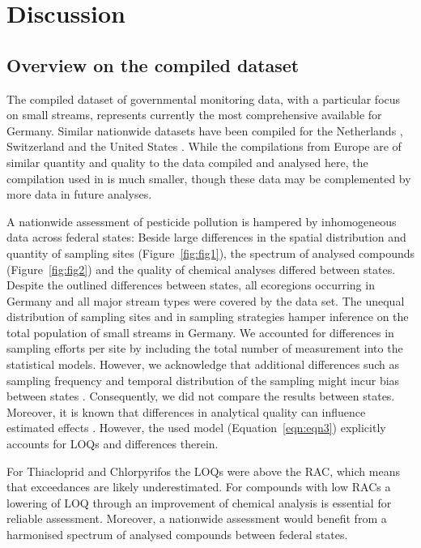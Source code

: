 \documentclass[journal=esthag,manuscript=article]{achemso}
\begin{document}
\section{Discussion}
\subsection{Overview on the compiled dataset}
The compiled dataset of governmental monitoring data, with a particular focus on small streams, represents currently the most comprehensive available for Germany.
Similar nationwide datasets have been compiled for the Netherlands \citep{vijver_spatial_2008}, Switzerland \citep{munz_pestizidmessungen_2011} and the United States \citep{stone2014pesticides}.
While the compilations from Europe are of similar quantity and quality to the  data compiled and analysed here, the compilation used in \citet{stone2014pesticides} is much smaller, though these data may be complemented by more data in future analyses. 

A nationwide assessment of pesticide pollution is hampered by inhomogeneous data across federal states:
Beside large differences in the spatial distribution and quantity of sampling sites (Figure~\ref{fig:fig1}), the spectrum of analysed compounds (Figure~\ref{fig:fig2}) and the quality of chemical analyses differed between states. 
Despite the outlined differences between states, all ecoregions occurring in Germany \citep{illies1978limnofauna,abell2008freshwater} and all major stream types were covered by the data set.
The unequal distribution of sampling sites and in sampling strategies hamper inference on the total population of small streams in Germany.
We accounted for differences in sampling efforts per site by including the total number of measurement into the statistical models. 
However, we acknowledge that additional differences such as sampling frequency and temporal distribution of the sampling might incur bias between states  \citep{stehle_probabilistic_2013,Xing_Chow_Rees_Meng_Li_Ernst_Benoy_Zha_Hewitt_2013}. 
Consequently, we did not compare the results between states.
Moreover, it is known that differences in analytical quality can influence estimated effects \citep{Martin_Eberle_Nakagaki, Schreiner_Szocs_Bhowmik_Vijver_Schafer_2016}.
However, the used model (Equation~\ref{eqn:eqn3}) explicitly accounts for LOQs and differences therein. 

For Thiacloprid and Chlorpyrifos the LOQs were above the RAC, which means that exceedances are likely underestimated.
For compounds with low RACs a lowering of LOQ through an improvement of chemical analysis is essential for reliable assessment.
Moreover, a nationwide assessment would benefit from a harmonised spectrum of analysed compounds between federal states. 
\end{document}
